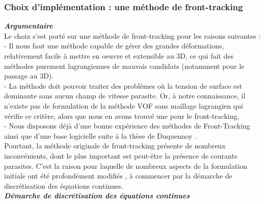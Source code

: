 \subsubsection{Choix d'impl\'ementation : une m\'ethode de front-tracking}

\textit{\textbf{Argumentaire}}\smallskip \\
Le choix s'est port\'e sur une m\'ethode de front-tracking pour les raisons suivantes : \\
- Il nous faut une m\'ethode capable de g\'erer des grandes d\'eformations, relativement facile \`a mettre en oeuvre et extensible au 3D, ce qui fait des m\'ethodes purement lagrangiennes de mauvais candidats (notamment pour le passage au 3D).\\
- La m\'ethode doit pouvoir traiter des probl\`emes o\`u la tension de surface est dominante sans aucun champ de vitesse parasite. Or, \`a notre connaissance, il n'existe pas de formulation de la m\'ethode VOF sans maillage lagrangien qui v\'erifie ce critère, alors que nous en avons trouv\'e une pour le front-tracking.\\
- Nous disposons d\'ej\`a d'une bonne exp\'erience des m\'ethodes de Front-Tracking ainsi que d'une base logicielle suite \`a la th\`ese de Duquennoy \cite{Duquennoy2000}.\\
Pourtant, la m\'ethode originale de front-tracking pr\'esente de nombreux inconv\'enients, dont le plus important est peut-\^etre la pr\'esence de courants parasites. C'est la raison pour laquelle de nombreux aspects de la formulation initiale ont \'et\'e profond\'ement modifi\'es , \`a commencer par la d\'emarche de discr\'etisation des \'equations continues.\smallskip \\

\textit{\textbf{D\'emarche de discr\'etisation des \'equations continues}}\smallskip \\

